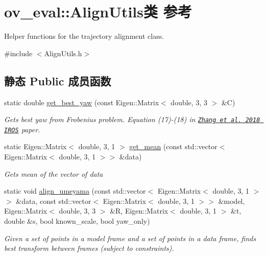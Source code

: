 \hypertarget{classov__eval_1_1AlignUtils}{}\section{ov\+\_\+eval\+:\+:Align\+Utils类 参考}
\label{classov__eval_1_1AlignUtils}


Helper functions for the trajectory alignment class.  




{\ttfamily \#include $<$Align\+Utils.\+h$>$}

\subsection*{静态 Public 成员函数}
\begin{DoxyCompactItemize}
\item 
static double \hyperlink{classov__eval_1_1AlignUtils_a6eafc0d55cb43fa6d2718a707697abff}{get\+\_\+best\+\_\+yaw} (const Eigen\+::\+Matrix$<$ double, 3, 3 $>$ \&C)
\begin{DoxyCompactList}\small\item\em Gets best yaw from Frobenius problem. Equation (17)-\/(18) in \href{http://rpg.ifi.uzh.ch/docs/IROS18_Zhang.pdf}{\tt Zhang et al. 2018 I\+R\+OS} paper. \end{DoxyCompactList}\item 
static Eigen\+::\+Matrix$<$ double, 3, 1 $>$ \hyperlink{classov__eval_1_1AlignUtils_a773b70968bab53fcaf45db308a70fe82}{get\+\_\+mean} (const std\+::vector$<$ Eigen\+::\+Matrix$<$ double, 3, 1 $>$$>$ \&data)
\begin{DoxyCompactList}\small\item\em Gets mean of the vector of data \end{DoxyCompactList}\item 
static void \hyperlink{classov__eval_1_1AlignUtils_a0047243dabf7448c01fdb118e13061e8}{align\+\_\+umeyama} (const std\+::vector$<$ Eigen\+::\+Matrix$<$ double, 3, 1 $>$$>$ \&data, const std\+::vector$<$ Eigen\+::\+Matrix$<$ double, 3, 1 $>$$>$ \&model, Eigen\+::\+Matrix$<$ double, 3, 3 $>$ \&R, Eigen\+::\+Matrix$<$ double, 3, 1 $>$ \&t, double \&s, bool known\+\_\+scale, bool yaw\+\_\+only)
\begin{DoxyCompactList}\small\item\em Given a set of points in a model frame and a set of points in a data frame, finds best transform between frames (subject to constraints). \end{DoxyCompactList}\item 
$$
\end{DoxyCompactItemize}
